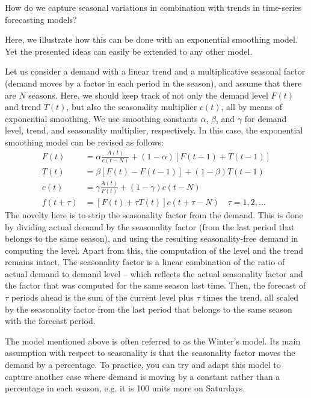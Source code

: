 \begin{exercise}
How do we capture seasonal variations in combination with trends in time-series forecasting models?



  \begin{solution}   
   Here, we illustrate how this can be done with an exponential smoothing model. Yet the presented ideas can easily be extended to any other model. 
 
Let us consider a demand with a linear trend and a multiplicative seasonal factor (demand moves by a factor in each period in the season), and assume that there are $N$ seasons. Here, we should keep track of not only the demand level $F(t)$ and trend $T(t)$, but also the seasonality multiplier $c(t)$, all by means of exponential smoothing. We use smoothing constants $\alpha$, $\beta$, and $\gamma$ for demand level, trend, and seasonality multiplier, respectively. In this case, the exponential smoothing model can be revised as follows:
\begin{align*}
F(t) & = \alpha  \frac{A(t)}{c(t-N)}+ (1-\alpha) [F(t-1) + T(t-1)] \\
T(t) & = \beta [F(t)-F(t-1)] + (1-\beta) T(t-1) \\
c(t) & = \gamma \frac{A(t)}{F(t)} + (1-\gamma) c(t-N) \\
f(t+\tau) & = [F(t) + \tau T(t)] c(t+\tau-N) \quad \tau = 1,2,\ldots
\end{align*}
The novelty here is to strip the seasonality factor from the demand. This is done by dividing actual demand by the seasonality factor (from the last period that belongs to the same season), and using the resulting seasonality-free demand in computing the level. Apart from this, the computation of the level and the trend remains intact. The seasonality factor is a linear combination of the ratio of actual demand to demand level -- which reflects the actual seasonality factor and the factor that was computed for the same season last time. Then, the forecast of $\tau$ periods ahead is the sum of the current level plus $\tau$ times the trend, all scaled by the seasonality factor from the last period that belongs to the same season with the forecast period. 

The model mentioned above is often referred to as the Winter's model. Its main assumption with respect to seasonality is that the seasonality factor moves the demand by a percentage. To practice, you can try and adapt this model to capture another case where demand is moving by a constant rather than a percentage in each season, e.g. it is 100 units more on Saturdays. 

  \end{solution}
\end{exercise}
  
